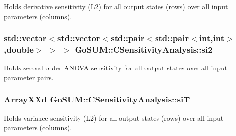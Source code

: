 Holds derivative sensitivity (L2) for all output states (rows) over all input parameters (columns). 

\hypertarget{class_go_s_u_m_1_1_c_sensitivity_analysis_aabc866244d32b74e89158997ea102f32}{
\subsubsection[{si2}]{\setlength{\rightskip}{0pt plus 5cm}std\-::vector$<$std\-::vector$<$std\-::pair$<$std\-::pair$<$int,int$>$,double$>$ $>$ $>$ Go\-S\-U\-M\-::\-C\-Sensitivity\-Analysis\-::si2\hspace{0.3cm}{\ttfamily [private]}}}\label{class_go_s_u_m_1_1_c_sensitivity_analysis_aabc866244d32b74e89158997ea102f32}


Holds second order A\-N\-O\-V\-A sensitivity for all output states over all input parameter pairs. 

\hypertarget{class_go_s_u_m_1_1_c_sensitivity_analysis_ab1c5393c009a6a16101da4062e8c9467}{
\subsubsection[{si\-T}]{\setlength{\rightskip}{0pt plus 5cm}Array\-X\-Xd Go\-S\-U\-M\-::\-C\-Sensitivity\-Analysis\-::si\-T\hspace{0.3cm}{\ttfamily [private]}}}\label{class_go_s_u_m_1_1_c_sensitivity_analysis_ab1c5393c009a6a16101da4062e8c9467}


Holds variance sensitivity (L2) for all output states (rows) over all input parameters (columns). 

